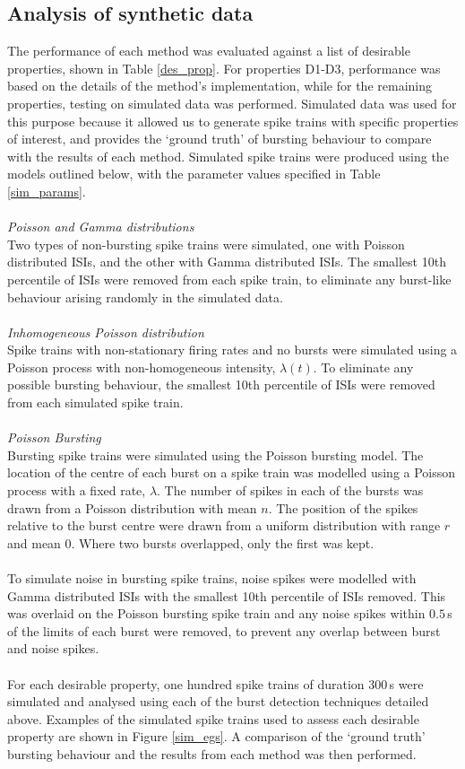 \documentclass[12pt, titlepage]{article}
\begin{document}
	\subsection*{Analysis of synthetic data}
	The performance of each method was evaluated against a list of desirable properties, shown in Table \ref{des_prop}. For properties D1-D3, performance was based on the details of the method's implementation, while for the remaining properties, testing on simulated data was performed. Simulated data was used for this purpose because it allowed us to generate spike trains with specific properties of interest, and provides the `ground truth' of bursting behaviour to compare with the results of each method. Simulated spike trains were produced using the models outlined below, with the parameter values specified in Table \ref{sim_params}.
	\\\\ 	\textit{Poisson and Gamma distributions}
	\\Two types of non-bursting spike trains were simulated, one with Poisson distributed ISIs, and the other with Gamma distributed ISIs. The smallest 10th percentile of ISIs were removed from each spike train, to eliminate any burst-like behaviour arising randomly in the simulated data.
	\\ \\  \textit{Inhomogeneous Poisson distribution}
	\\ Spike trains with non-stationary firing rates and no bursts were simulated using a Poisson process with non-homogeneous intensity, $\lambda(t)$. To eliminate any possible bursting behaviour, the smallest 10th percentile of ISIs were removed from each simulated spike train.
	\\ \\  \textit{Poisson Bursting}
	\\ Bursting spike trains were simulated using the Poisson bursting model. The location of the centre of each burst on a spike train was modelled using a Poisson process with a fixed rate, $\lambda$. The number of spikes in each of the bursts was drawn from a Poisson distribution with mean $n$. The position of the spikes relative to the burst centre were drawn from a uniform distribution with range $r$ and mean 0. Where two bursts overlapped, only the first was kept. 
	\\ \\ To simulate noise in bursting spike trains, noise spikes were modelled with Gamma distributed ISIs with the smallest 10th percentile of ISIs removed. This was overlaid on the Poisson bursting spike train and any noise spikes within $0.5 \,$s of the limits of each burst were removed, to prevent any overlap between burst and noise spikes.
	\\ \\ For each desirable property, one hundred spike trains of duration 300$\,$s were simulated and analysed using each of the burst detection techniques detailed above. Examples of the simulated spike trains used to assess each desirable property are shown in Figure \ref{sim_egs}. A comparison of the `ground truth' bursting behaviour and the results from each method was then performed. 
\end{document}
